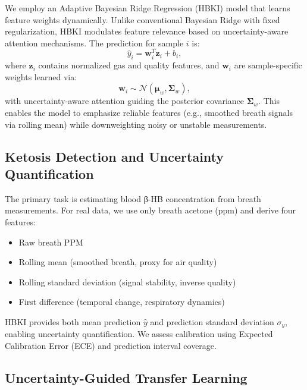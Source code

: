 \documentclass{ieeeaccess}
\begin{document}
We employ an Adaptive Bayesian Ridge Regression (HBKI) model that learns feature weights dynamically. Unlike conventional Bayesian Ridge with fixed regularization, HBKI modulates feature relevance based on uncertainty-aware attention mechanisms. The prediction for sample $i$ is:
\begin{equation}
\hat{y}_i = \mathbf{w}_i^T \mathbf{z}_i + b_i,
\end{equation}
where $\mathbf{z}_i$ contains normalized gas and quality features, and $\mathbf{w}_i$ are sample-specific weights learned via:
\begin{equation}
\mathbf{w}_i \sim \mathcal{N}(\boldsymbol{\mu}_w, \boldsymbol{\Sigma}_w),
\end{equation}
with uncertainty-aware attention guiding the posterior covariance $\boldsymbol{\Sigma}_w$. This enables the model to emphasize reliable features (e.g., smoothed breath signals via rolling mean) while downweighting noisy or unstable measurements.

\subsection{Ketosis Detection and Uncertainty Quantification}

The primary task is estimating blood β-HB concentration from breath measurements. For real data, we use only breath acetone (ppm) and derive four features:
\begin{itemize}
\item Raw breath PPM
\item Rolling mean (smoothed breath, proxy for air quality)
\item Rolling standard deviation (signal stability, inverse quality)
\item First difference (temporal change, respiratory dynamics)
\end{itemize}
HBKI provides both mean prediction $\hat{y}$ and prediction standard deviation $\sigma_y$, enabling uncertainty quantification. We assess calibration using Expected Calibration Error (ECE) and prediction interval coverage.

\subsection{Uncertainty-Guided Transfer Learning}
\end{document}
